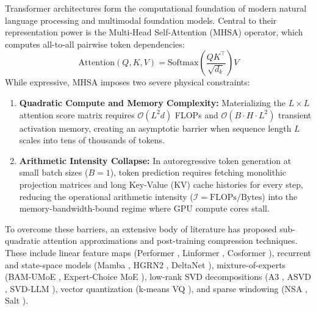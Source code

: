 \documentclass{article}
\begin{document}
Transformer architectures \citep{vaswani2017attention} form the computational foundation of modern natural language processing and multimodal foundation models. Central to their representation power is the Multi-Head Self-Attention (MHSA) operator, which computes all-to-all pairwise token dependencies:
\begin{equation}
    \text{Attention}(Q, K, V) = \text{Softmax}\left(\frac{Q K^\top}{\sqrt{d_k}}\right) V
\end{equation}
While expressive, MHSA imposes two severe physical constraints:
\begin{enumerate}
    \item \textbf{Quadratic Compute and Memory Complexity:} Materializing the $L \times L$ attention score matrix requires $\mathcal{O}(L^2 d)$ FLOPs and $\mathcal{O}(B \cdot H \cdot L^2)$ transient activation memory, creating an asymptotic barrier when sequence length $L$ scales into tens of thousands of tokens.
    \item \textbf{Arithmetic Intensity Collapse:} In autoregressive token generation at small batch sizes ($B=1$), token prediction requires fetching monolithic projection matrices and long Key-Value (KV) cache histories for every step, reducing the operational arithmetic intensity ($\mathcal{I} = \text{FLOPs} / \text{Bytes}$) into the memory-bandwidth-bound regime where GPU compute cores stall.
\end{enumerate}

To overcome these barriers, an extensive body of literature has proposed sub-quadratic attention approximations and post-training compression techniques. These include linear feature maps (Performer \citep{choromanski2021rethinking}, Linformer \citep{wang2020linformer}, Cosformer \citep{qin2022cosformer}), recurrent and state-space models (Mamba \citep{gu2022mamba}, HGRN2 \citep{dong2024hgrn2}, DeltaNet \citep{schlag2021deltanet}), mixture-of-experts (BAM-UMoE \citep{bam_umoe_2025}, Expert-Choice MoE \citep{expert_choice_moe_2022}), low-rank SVD decompositions (A3 \citep{a3_ours}, ASVD \citep{yuan2023asvd}, SVD-LLM \citep{wang2024svdllm}), vector quantization (k-means VQ \citep{stock2020and}), and sparse windowing (NSA \citep{nsa_2024}, Salt \citep{salt_2024}).
\end{document}
